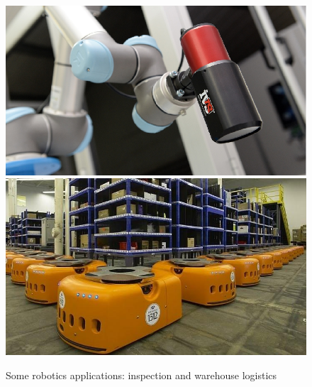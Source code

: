\documentclass{bmvc2k}
\begin{document}
\begin{figure}[h!]
\begin{center}
\includegraphics[scale=0.25]{Collaborative-Robot-Inspection.png}
\includegraphics[scale=0.2]{amazonlogistics.jpg}
\caption{Some robotics applications: inspection and warehouse logistics}
\label{fig:apps}
\end{center}
\end{figure}
\end{document}
